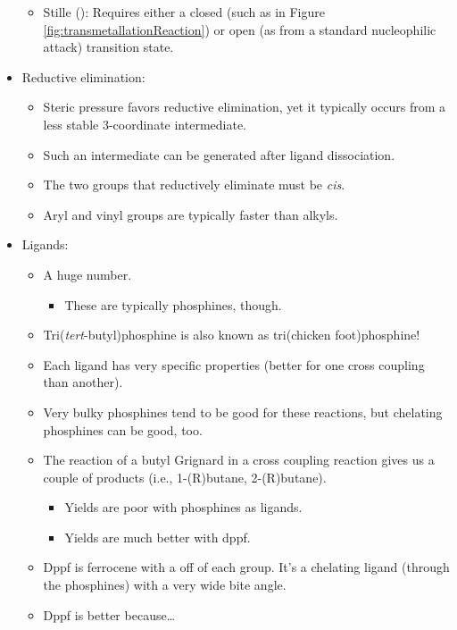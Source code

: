 \documentclass[../notes.tex]{subfiles}
\begin{document}
\begin{itemize}
\begin{itemize}
\begin{itemize}
        \end{itemize}
        \item Stille (): Requires either a closed (such as in Figure \ref{fig:transmetallationReaction}) or open (as from a standard nucleophilic attack) transition state.
    \end{itemize}
    \item Reductive elimination:
    \begin{itemize}
        \item Steric pressure favors reductive elimination, yet it typically occurs from a less stable 3-coordinate intermediate.
        \item Such an intermediate can be generated after ligand dissociation.
        \item The two groups that reductively eliminate must be \emph{cis}.
        \item Aryl and vinyl groups are typically faster than alkyls.
    \end{itemize}
    \item Ligands:
    \begin{itemize}
        \item A huge number.
        \begin{itemize}
            \item These are typically phosphines, though.
        \end{itemize}
        \item Tri(\emph{tert}-butyl)phosphine is also known as tri(chicken foot)phosphine!
        \item Each ligand has very specific properties (better for one cross coupling than another).
        \item Very bulky phosphines tend to be good for these reactions, but chelating phosphines can be good, too.
        \item The reaction of a butyl Grignard in a cross coupling reaction gives us a couple of products (i.e., 1-(R)butane, 2-(R)butane).
        \begin{itemize}
            \item Yields are poor with phosphines as  ligands.
            \item Yields are much better with dppf.
        \end{itemize}
        \item Dppf is ferrocene with a  off of each  group. It's a chelating ligand (through the phosphines) with a very wide bite angle.
        \item Dppf is better because\dots

\end{itemize}
\end{itemize}
\end{document}

